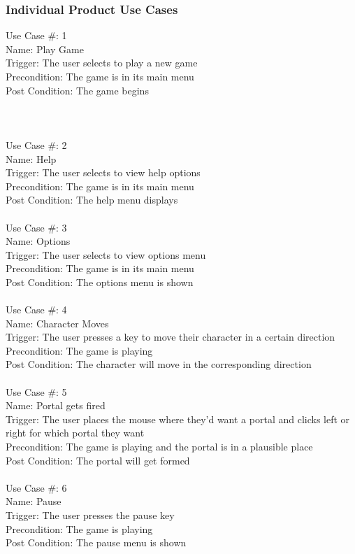 \documentclass[12pt, titlepage]{article}
\begin{document}
\subsubsection{Individual Product Use Cases}

Use Case \#: 1\\
Name: Play Game\\
Trigger: The user selects to play a new game\\
Precondition: The game is in its main menu\\
Post Condition: The game begins\\
\\
\\
\\
Use Case \#: 2\\
Name: Help \\
Trigger: The user selects to view help options\\
Precondition: The game is in its main menu\\
Post Condition: The help menu displays\\
\\
Use Case \#: 3\\
Name: Options\\
Trigger: The user selects to view options menu\\
Precondition: The game is in its main menu\\
Post Condition: The options menu is shown\\
\\
Use Case \#: 4\\
Name: Character Moves\\
Trigger: The user presses a key to move their character in a certain direction\\
Precondition: The game is playing\\
Post Condition: The character will move in the corresponding direction\\
\\
Use Case \#: 5\\
Name: Portal gets fired\\
Trigger: The user places the mouse where they'd want a portal and clicks left or right for which portal they want\\
Precondition: The game is playing and the portal is in a plausible place\\
Post Condition: The portal will get formed\\
\\
Use Case \#: 6\\
Name: Pause\\
Trigger: The user presses the pause key\\
Precondition: The game is playing\\
Post Condition: The pause menu is shown\\
\end{document}

